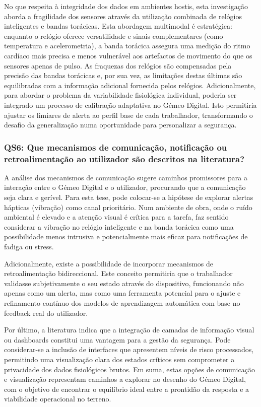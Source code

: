 No que respeita à integridade dos dados em ambientes hostis, esta investigação aborda a fragilidade dos sensores através da utilização combinada de relógios inteligentes e bandas torácicas. Esta abordagem multimodal é estratégica: enquanto o relógio oferece versatilidade e sinais complementares (como temperatura e acelerometria), a banda torácica assegura uma medição do ritmo cardíaco mais precisa e menos vulnerável aos artefactos de movimento do que os sensores apenas de pulso. As fraquezas dos relógios são compensadas pela precisão das bandas torácicas e, por sua vez, as limitações destas últimas são equilibradas com a informação adicional fornecida pelos relógios. Adicionalmente, para abordar o problema da variabilidade fisiológica individual, poderia ser integrado um processo de calibração adaptativa no Gémeo Digital. Isto permitiria ajustar os limiares de alerta ao perfil base de cada trabalhador, transformando o desafio da generalização numa oportunidade para personalizar a segurança.

\subsubsection*{QS6: Que mecanismos de comunicação, notificação ou retroalimentação ao utilizador são descritos na literatura?}
\label{subsubsec:qs6_analisis}

A análise dos mecanismos de comunicação sugere caminhos promissores para a interação entre o Gémeo Digital e o utilizador, procurando que a comunicação seja clara e gerível. Para esta tese, pode colocar-se a hipótese de explorar alertas hápticas (vibração) como canal prioritário. Num ambiente de obra, onde o ruído ambiental é elevado e a atenção visual é crítica para a tarefa, faz sentido considerar a vibração no relógio inteligente e na banda torácica como uma possibilidade menos intrusiva e potencialmente mais eficaz para notificações de fadiga ou stress.

Adicionalmente, existe a possibilidade de incorporar mecanismos de retroalimentação bidireccional. Este conceito permitiria que o trabalhador validasse subjetivamente o seu estado através do dispositivo, funcionando não apenas como um alerta, mas como uma ferramenta potencial para o ajuste e refinamento contínuo dos modelos de aprendizagem automática com base no feedback real do utilizador.

Por último, a literatura indica que a integração de camadas de informação visual ou dashboards constitui uma vantagem para a gestão da segurança. Pode considerar-se a inclusão de interfaces que apresentem níveis de risco processados, permitindo uma visualização clara dos estados críticos sem comprometer a privacidade dos dados fisiológicos brutos. Em suma, estas opções de comunicação e visualização representam caminhos a explorar no desenho do Gémeo Digital, com o objetivo de encontrar o equilíbrio ideal entre a prontidão da resposta e a viabilidade operacional no terreno.

